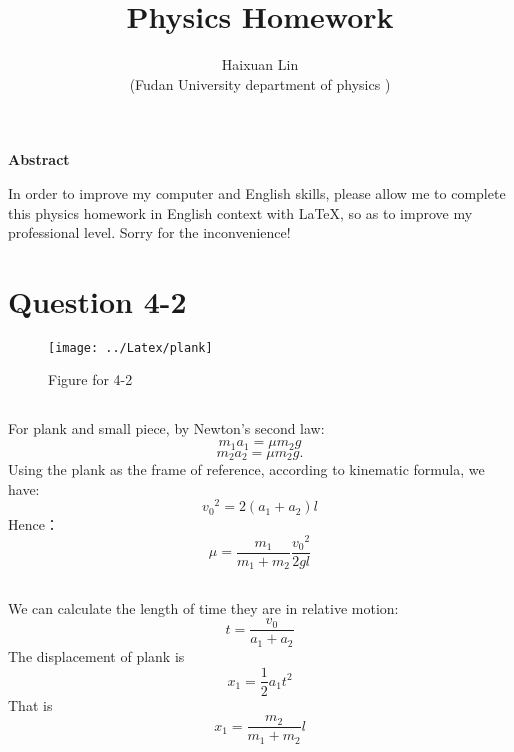 \documentclass[12pt,a4paper]{article}%
\title{\fontsize{18pt}{27pt}\selectfont%
	{\heiti%
		Physics Homework}}%
\author{\fontsize{12pt}{18pt}\selectfont%
	{\fangsong%
	Haixuan Lin}\\%
	\fontsize{10.5pt}{15.75pt}\selectfont%
	{\fangsong%
		(Fudan University department of physics
		)}}%
\date{}%
\begin{document}
	\maketitle%
	\lhead{}%
	\chead{}%
	\rhead{}%
	\lfoot{}%
	\cfoot{\thepage}%
	\rfoot{}%
	
	\begin{center}%
		{\textbf{Abstract}}%
	\end{center}
	\begin{adjustwidth}{1.06cm}{1.06cm}%
		\hspace{1.5em}In order to improve my computer and English skills, please allow me to complete this physics homework in English context with \LaTeX, so as to improve my professional level. Sorry for the inconvenience!
	\end{adjustwidth}
	\newpage%
	
	\section{Question 4-2}
	\begin{figure}[H]
		\centering
		\texttt{[image: ../Latex/plank]}
		\caption*{Figure for 4-2}
		\label{fig:plank}
	\end{figure}
	
	\subsection{}
	\noindent For plank and small piece, by Newton's second law:
	\begin{equation}
		m_1a_1=\mu m_2g
	\end{equation}
	\begin{equation}
		m_2a_2=\mu m_2g.
	\end{equation}
	Using the plank as the frame of reference, according to kinematic formula, we have:
	\begin{equation}
		{v_0}^2=2\left( a_1+a_2 \right) l
	\end{equation}
	Hence：
	\begin{equation*}
		\mu=\frac{m_1}{m_1+m_2}\frac{{v_0}^2}{2gl}
	\end{equation*}
	\subsection{}	
	\noindent We can calculate the length of time they are in relative motion:
	 \begin{equation}
	 	t=\frac{v_0}{a_1+a_2}
	 \end{equation}	
	 The displacement of plank is
	 \begin{equation}
	 	x_1=\frac{1}{2}a_1t^2
	 \end{equation}
	That is
	\begin{equation*}
		x_1=\frac{m_2}{m_1+m_2}l
	\end{equation*}
	\newpage
\end{document}
